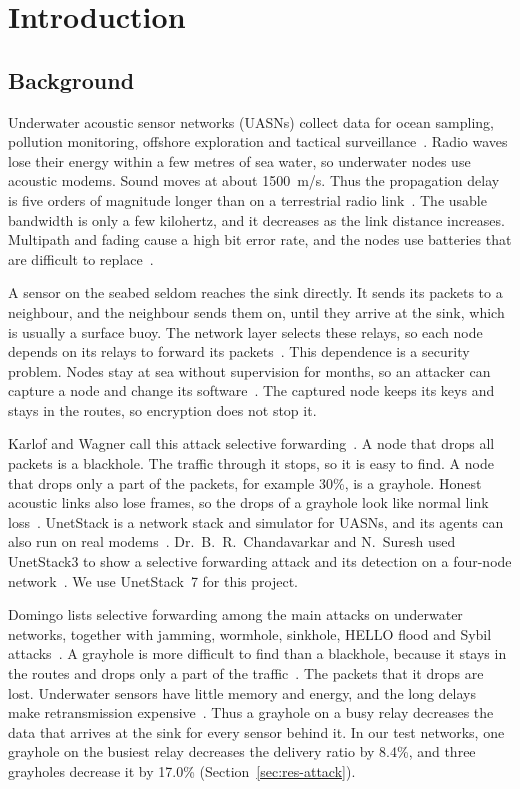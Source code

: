 \documentclass[11pt]{article}
\begin{document}
\clearpage
\section{Introduction}\label{sec:intro}

\subsection{Background}\label{sec:background}
\noindent
Underwater acoustic sensor networks (UASNs) collect data for ocean sampling, pollution monitoring, offshore exploration and tactical surveillance~\cite{akyildiz2005,brc2021}.
Radio waves lose their energy within a few metres of sea water, so underwater nodes use acoustic modems.
Sound moves at about 1500~m/s.
Thus the propagation delay is five orders of magnitude longer than on a terrestrial radio link~\cite{akyildiz2005}.
The usable bandwidth is only a few kilohertz, and it decreases as the link distance increases.
Multipath and fading cause a high bit error rate, and the nodes use batteries that are difficult to replace~\cite{akyildiz2005}.

A sensor on the seabed seldom reaches the sink directly.
It sends its packets to a neighbour, and the neighbour sends them on, until they arrive at the sink, which is usually a surface buoy.
The network layer selects these relays, so each node depends on its relays to forward its packets~\cite{brc2021}.
This dependence is a security problem.
Nodes stay at sea without supervision for months, so an attacker can capture a node and change its software~\cite{domingo2011,jiang2019}.
The captured node keeps its keys and stays in the routes, so encryption does not stop it.

Karlof and Wagner call this attack selective forwarding~\cite{karlof2003}.
A node that drops all packets is a blackhole.
The traffic through it stops, so it is easy to find.
A node that drops only a part of the packets, for example 30\%, is a grayhole.
Honest acoustic links also lose frames, so the drops of a grayhole look like normal link loss~\cite{akyildiz2005,domingo2011}.
UnetStack is a network stack and simulator for UASNs, and its agents can also run on real modems~\cite{chitre2014}.
Dr.~B.~R.~Chandavarkar and N.~Suresh used UnetStack3 to show a selective forwarding attack and its detection on a four-node network~\cite{brc2021}.
We use UnetStack~7 for this project.

Domingo lists selective forwarding among the main attacks on underwater networks, together with jamming, wormhole, sinkhole, HELLO flood and Sybil attacks~\cite{domingo2011}.
A grayhole is more difficult to find than a blackhole, because it stays in the routes and drops only a part of the traffic~\cite{karlof2003}.
The packets that it drops are lost.
Underwater sensors have little memory and energy, and the long delays make retransmission expensive~\cite{akyildiz2005}.
Thus a grayhole on a busy relay decreases the data that arrives at the sink for every sensor behind it.
In our test networks, one grayhole on the busiest relay decreases the delivery ratio by 8.4\%, and three grayholes decrease it by 17.0\% (Section~\ref{sec:res-attack}).
\end{document}
